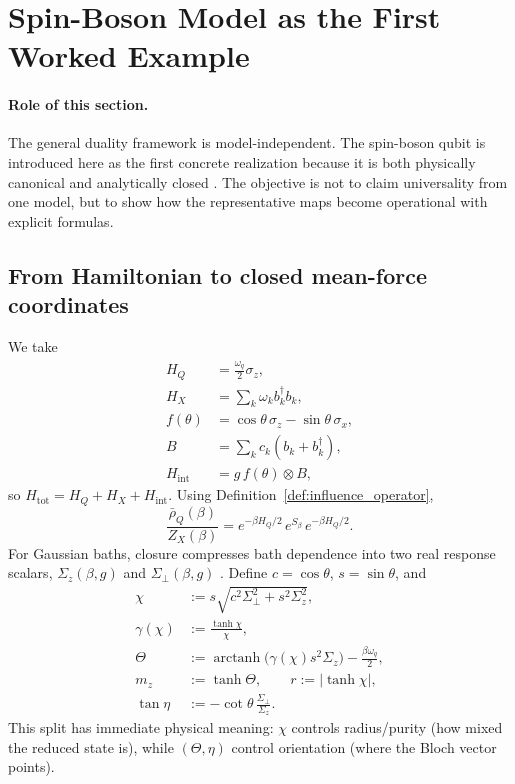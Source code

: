 \section{Spin-Boson Model as the First Worked Example}
\label{sec:spin_boson_example}

\paragraph{Role of this section.}
The general duality framework is model-independent.
The spin-boson qubit is introduced here as the first concrete realization because it is both
physically canonical and analytically closed
\cite{leggettDynamicsDissipativeTwostate1987,cresserWeakUltrastrongCoupling2021a}.
The objective is not to claim universality from one model, but to show how the representative maps
become operational with explicit formulas.

\subsection{From Hamiltonian to closed mean-force coordinates}

We take
\begin{align}
  H_Q &= \frac{\omega_q}{2}\sigma_z, \\
  H_X &= \sum_k \omega_k b_k^\dagger b_k, \\
  f(\theta) &= \cos\theta\,\sigma_z - \sin\theta\,\sigma_x, \\
  B &= \sum_k c_k(b_k+b_k^\dagger), \\
  H_{\mathrm{int}} &= g\,f(\theta)\otimes B,
\end{align}
so \(H_{\mathrm{tot}}=H_Q+H_X+H_{\mathrm{int}}\).
Using Definition~\ref{def:influence_operator},
\begin{equation}
  \frac{\bar{\rho}_Q(\beta)}{Z_X(\beta)}
  = e^{-\beta H_Q/2}\,e^{S_\beta}\,e^{-\beta H_Q/2}.
\end{equation}
For Gaussian baths, closure compresses bath dependence into two real response scalars,
\(\Sigma_z(\beta,g)\) and \(\Sigma_\perp(\beta,g)\)
\cite{cresserWeakUltrastrongCoupling2021a,cerisolaQuantumClassicalCorrespondence2024,mccaulMeanForceHamiltoniansInfluence2026}.
Define \(c=\cos\theta\), \(s=\sin\theta\), and
\begin{align}
  \chi &:= s\sqrt{c^2\Sigma_\perp^2+s^2\Sigma_z^2}, \\
  \gamma(\chi) &:= \frac{\tanh\chi}{\chi}, \\
  \Theta &:= \operatorname{arctanh}\!\big(\gamma(\chi)s^2\Sigma_z\big)-\frac{\beta\omega_q}{2}, \\
  m_z &:= \tanh\Theta, \qquad r:=|\tanh\chi|, \\
  \tan\eta &:= -\cot\theta\,\frac{\Sigma_\perp}{\Sigma_z}.
\end{align}
This split has immediate physical meaning:
\(\chi\) controls radius/purity (how mixed the reduced state is), while \((\Theta,\eta)\) control
orientation (where the Bloch vector points).

